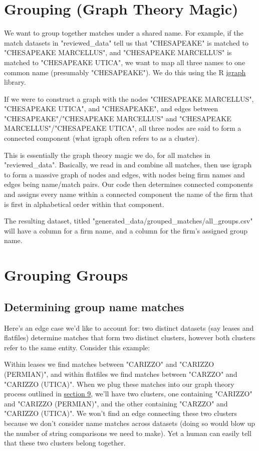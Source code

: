 \documentclass{article}
\begin{document}
\section{Grouping (Graph Theory Magic)}
\label{sec:graph-theory}

We want to group together matches under a shared name. For example, if the match datasets in "reviewed\_data" tell us that "CHESAPEAKE" is matched to "CHESAPEAKE MARCELLUS", and "CHESAPEAKE MARCELLUS" is matched to "CHESAPEAKE UTICA", we want to map all three names to one common name (presumably "CHESAPEAKE"). We do this using the R \href{https://cran.r-project.org/web/packages/igraph/igraph.pdf}{igraph} library. 

If we were to construct a graph with the nodes "CHESAPEAKE MARCELLUS", "CHESAPEAKE UTICA", and "CHESAPEAKE", and edges between "CHESAPEAKE"/"CHESAPEAKE MARCELLUS" and "CHESAPEAKE MARCELLUS"/"CHESAPEAKE UTICA", all three nodes are said to form a connected component (what igraph often refers to as a cluster). 

This is essentially the graph theory magic we do, for all matches in "reviewed\_data". Basically, we read in and combine all matches, then use igraph to form a massive graph of nodes and edges, with nodes being firm names and edges being name/match pairs. Our code then determines connected components and assigns every name within a connected component the name of the firm that is first in alphabetical order within that component. 

The resulting dataset, titled "generated\_data/grouped\_matches/all\_groups.csv" will have a column for a firm name, and a column for the firm's assigned group name. 

\section{Grouping Groups}

\subsection{Determining group name matches}

Here's an edge case we'd like to account for: two distinct datasets (say leases and flatfiles) determine matches that form two distinct clusters, however both clusters refer to the same entity. Consider this example:

Within leases we find matches between "CARIZZO" and "CARIZZO (PERMIAN)", and within flatfiles we find matches between "CARZZO" and "CARIZZO (UTICA)". When we plug these matches into our graph theory process outlined in  \hyperref[sec:graph-theory]{section 9}, we'll have two clusters, one containing "CARIZZO" and "CARIZZO (PERMIAN)", and the other containing "CARZZO" and "CARIZZO (UTICA)". We won't find an edge connecting these two clusters because we don't consider name matches across datasets (doing so would blow up the number of string comparisons we need to make). Yet a human can easily tell that these two clusters belong together.
\end{document}
